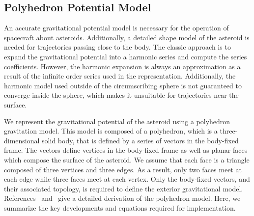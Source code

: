 \subsection{Polyhedron Potential Model}\label{sec:polyhedron_potential}

An accurate gravitational potential model is necessary for the operation of spacecraft about asteroids.
Additionally, a detailed shape model of the asteroid is needed for trajectories passing close to the body.
The classic approach is to expand the gravitational potential into a harmonic series and compute the series coefficients.
However, the harmonic expansion is always an approximation as a result of the infinite order series used in the representation.
Additionally, the harmonic model used outside of the circumscribing sphere is not guaranteed to converge inside the sphere, which makes it unsuitable for trajectories near the surface.

We represent the gravitational potential of the asteroid using a polyhedron gravitation model.
This model is composed of a polyhedron, which is a three-dimensional solid body, that is defined by a series of vectors in the body-fixed frame.
The vectors define vertices in the body-fixed frame as well as planar faces which compose the surface of the asteroid.
We assume that each face is a triangle composed of three vertices and three edges.
As a result, only two faces meet at each edge while three faces meet at each vertex.
Only the body-fixed vectors, and their associated topology, is required to define the exterior gravitational model.
References~\cite{werner1994} and~\cite{werner1996} give a detailed derivation of the polyhedron model.
Here, we summarize the key developments and equations required for implementation.

